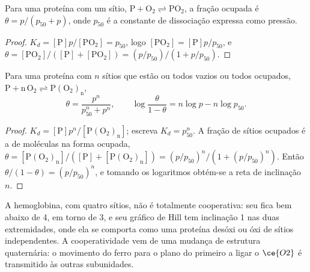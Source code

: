 \begin{proposition}\label{prop:b3:bioinorganic:hyperbola}
Para uma proteína com um sítio, $\mathrm{P + O_2 \rightleftharpoons PO_2}$, a fração ocupada é $\theta = p/(p_{50} + p)$, onde $p_{50}$ é
a constante de dissociação expressa como pressão.
\end{proposition}

\begin{proof}
$K_d = [\mathrm P]p/[\mathrm{PO_2}] = p_{50}$, logo $[\mathrm{PO_2}] = [\mathrm P]p/p_{50}$, e $\theta = [\mathrm{PO_2}]/([\mathrm P] + [\mathrm{PO_2}]) = (p/p_{50})/(1 + p/p_{50})$.
\end{proof}

\begin{theorem}\label{thm:b3:bioinorganic:hill}
Para uma proteína com $n$ sítios que estão ou todos vazios ou todos ocupados,
$\mathrm{P + n\,O_2 \rightleftharpoons P(O_2)_n}$,
\[
  \theta = \frac{p^n}{p_{50}^n + p^n}, \qquad \log\frac{\theta}{1 - \theta} = n\log p - n\log p_{50}.
\]
\end{theorem}

\begin{proof}
$K_d = [\mathrm P]p^n/[\mathrm{P(O_2)_n}]$; escreva $K_d = p_{50}^n$. A fração de sítios ocupados é a de moléculas
na forma ocupada, $\theta = [\mathrm{P(O_2)_n}]/([\mathrm P] + [\mathrm{P(O_2)_n}]) = (p/p_{50})^n/(1 + (p/p_{50})^n)$. Então $\theta/(1 - \theta) = (p/p_{50})^n$, e tomando os
logaritmos obtém-se a reta de inclinação $n$.
\end{proof}

A hemoglobina, com quatro sítios, não é totalmente cooperativa: seu  fica
bem abaixo de 4, em torno de 3, e seu gráfico de Hill tem inclinação 1 nas duas extremidades, onde
ela se comporta como uma proteína desóxi ou óxi de sítios independentes. A
cooperatividade vem de uma mudança de estrutura quaternária: o movimento do
ferro para o plano do primeiro  a ligar o $\ce{O2}$ é transmitido às outras subunidades.

